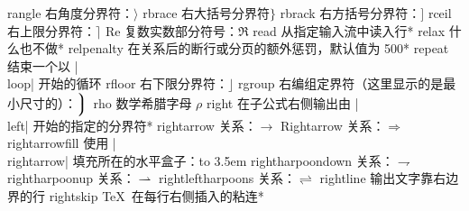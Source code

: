 \capcs rangle {右角度分界符：$\rangle$}{}{}
\capcs rbrace {右大括号分界符$\rbrace$}{}{}
\capcs rbrack {右方括号分界符：$\rbrack$}{}{}
\capcs rceil {右上限分界符：$\rceil$}{}{}
\capcs Re {复数实数部分符号：$\Re$}{}{}
\capcs read {从指定输入流中读入行}*{}
\capcs relax {什么也不做}*{}
\capcs relpenalty {在关系后的断行或分页的额外惩罚，默认值为 500}*{}
\capcs repeat {结束一个以 |\\loop| 开始的循环}{}{\@repeat}
\capcs rfloor {右下限分界符：$\rfloor$}{}{}
\capcs rgroup {右编组定界符（这里显示的是最小尺寸的）：$\Big\rgroup$}{}{}
\capcs rho {数学希腊字母 $\rho$}{}{}
\capcs right {在子公式右侧输出由 |\\left| 开始的指定的分界符}*{}
\capcs rightarrow {关系：$\rightarrow$}{}{}
\capcs Rightarrow {关系：$\Rightarrow$}{}{}
\capcs rightarrowfill {使用 |\\rightarrow| 填充所在的水平盒子：\hbox to 3.5em{\rightarrowfill}}{}{}
\capcs rightharpoondown {关系：$\rightharpoondown$}{}{}
\capcs rightharpoonup {关系：$\rightharpoonup$}{}{}
\capcs rightleftharpoons {关系：$\rightleftharpoons$}{}{}
\capcs rightline {输出文字靠右边界的行}{}{}
\capcs rightskip {\TeX\ 在每行右侧插入的粘连}*{}

